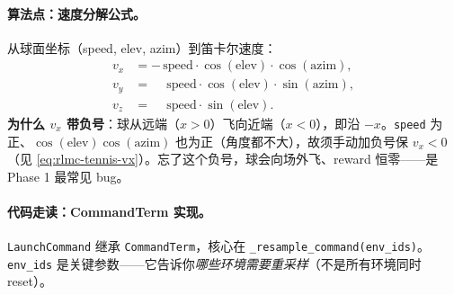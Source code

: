\paragraph{算法点：速度分解公式。}从球面坐标（speed, elev, azim）到笛卡尔速度：
\begin{align}
v_x &= -\,\text{speed}\cdot\cos(\text{elev})\cdot\cos(\text{azim}),\label{eq:rlmc-tennis-vx}\\
v_y &= \phantom{-}\text{speed}\cdot\cos(\text{elev})\cdot\sin(\text{azim}),\label{eq:rlmc-tennis-vy}\\
v_z &= \phantom{-}\text{speed}\cdot\sin(\text{elev}).\label{eq:rlmc-tennis-vz}
\end{align}
\textbf{为什么 $v_x$ 带负号}：球从远端（$x>0$）飞向近端（$x<0$），即沿 $-x$。\verb|speed| 为正、$\cos(\text{elev})\cos(\text{azim})$ 也为正（角度都不大），故须手动加负号保 $v_x<0$（见 \eqref{eq:rlmc-tennis-vx}）。忘了这个负号，球会向场外飞、reward 恒零——是 Phase 1 最常见 bug。

\paragraph{代码走读：CommandTerm 实现。}\verb|LaunchCommand| 继承 \verb|CommandTerm|，核心在 \verb|_resample_command(env_ids)|。\verb|env_ids| 是关键参数——它告诉你\emph{哪些环境需要重采样}（不是所有环境同时 reset）。

